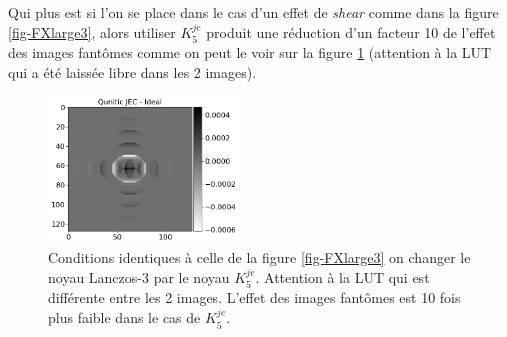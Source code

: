 \documentclass[11pt,twoside]{article}
\begin{document}
Qui plus est si l'on se place dans le cas d'un effet de \textit{shear} comme dans la figure \ref{fig-FXlarge3}, alors utiliser $K_5^{je}$ produit une réduction d'un facteur 10 de l'effet des images fantômes comme on peut le voir sur la figure \ref{fig-FXlarge-shear-QuniticJE} (attention à la LUT qui a été laissée libre dans les 2 images).
\begin{figure}
\centering
\includegraphics[width=0.45\textwidth]{fig27.png}
\caption{Conditions identiques à celle de la figure \ref{fig-FXlarge3} on changer le noyau Lanczos-3 par le noyau $K_5^{je}$. Attention à la LUT qui est différente entre les 2 images. L'effet des images fantômes est 10 fois plus faible dans le cas de $K_5^{je}$.}
\label{fig-FXlarge-shear-QuniticJE}
\end{figure}
%
\newpage
\end{document}
